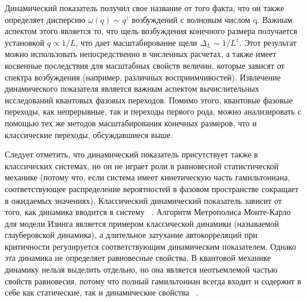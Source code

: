 \documentclass[11pt]{article}
\begin{document}
Динамический показатель получил свое название от того факта, что он также определяет дисперсию $\omega(q) \sim q^z$ возбуждений с волновым числом q. Важным аспектом этого является то, что щель возбуждения конечного размера получается установкой $q \propto 1/ L$, что дает масштабирование щели $\Delta_L ∼ 1 / L^z$. Этот результат можно использовать непосредственно в численных расчетах, а также имеет косвенные последствия для масштабных свойств величин, которые зависят от спектра возбуждения (например, различных восприимчивостей). Извлечение динамического показателя является важным аспектом вычислительных исследований квантовых фазовых переходов. Помимо этого, квантовые фазовые переходы, как непрерывные, так и переходы первого рода, можно анализировать с помощью тех же методов масштабирования конечных размеров, что и классические переходы, обсуждавшиеся выше.

Следует отметить, что динамический показатель присутствует также в классических системах, но он не играет роли в равновесной статистической механике (потому что, если система имеет кинетическую часть гамильтониана, соответствующее распределение вероятностей в фазовом пространстве сокращает в ожидаемых значениях). Классический динамический показатель зависит от того, как динамика вводится в систему ~\cite{prb_13_1299}. Алгоритм Метрополиса Монте-Карло для модели Изинга является примером классической динамики (называемой глауберовской
динамика), а длительное затухание автокорреляций при критичности регулируется соответствующим динамическим показателем. Однако эта динамика не определяет равновесные свойства. В квантовой механике динамику нельзя выделить отдельно, но она является неотъемлемой частью свойств равновесия, потому что полный гамильтониан всегда входит и содержит в себе как статические, так и динамические свойства ~\cite{prb_69_315}.
\end{document}

